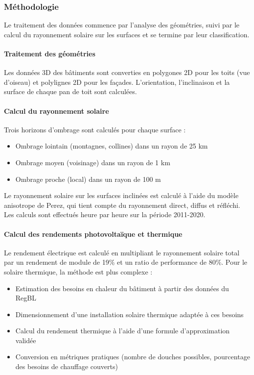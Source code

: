 \subsubsection{Méthodologie}
\par{Le traitement des données commence par l'analyse des géométries, suivi par le calcul du rayonnement solaire sur les surfaces et se termine par leur classification.}

\paragraph{Traitement des géométries}
\par{Les données 3D des bâtiments sont converties en polygones 2D pour les toits (vue d'oiseau) et polylignes 2D pour les façades. L'orientation, l'inclinaison et la surface de chaque pan de toit sont calculées.}

\paragraph{Calcul du rayonnement solaire}
Trois horizons d'ombrage sont calculés pour chaque surface :
\begin{itemize}
    \item Ombrage lointain (montagnes, collines) dans un rayon de 25 km
    \item Ombrage moyen (voisinage) dans un rayon de 1 km
    \item Ombrage proche (local) dans un rayon de 100 m
\end{itemize}
\par{Le rayonnement solaire sur les surfaces inclinées est calculé à l'aide du modèle anisotrope de Perez, qui tient compte du rayonnement direct, diffus et réfléchi. Les calculs sont effectués heure par heure sur la période 2011-2020.}

\paragraph{Calcul des rendements photovoltaïque et thermique}
\par{Le rendement électrique est calculé en multipliant le rayonnement solaire total par un rendement de module de 19\% et un ratio de performance de 80\%. Pour le solaire thermique, la méthode est plus complexe :}
\begin{itemize}
    \item Estimation des besoins en chaleur du bâtiment à partir des données du RegBL
    \item Dimensionnement d'une installation solaire thermique adaptée à ces besoins
    \item Calcul du rendement thermique à l'aide d'une formule d'approximation validée
    \item Conversion en métriques pratiques (nombre de douches possibles, pourcentage des besoins de chauffage couverts)
\end{itemize}


